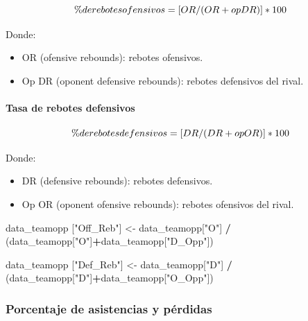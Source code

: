 \documentclass[
]{article}
\newenvironment{Shaded}{\begin{snugshade}}{\end{snugshade}}
\newcommand{\NormalTok}[1]{#1}
\newcommand{\OperatorTok}[1]{\textcolor[rgb]{0.81,0.36,0.00}{\textbf{#1}}}
\newcommand{\StringTok}[1]{\textcolor[rgb]{0.31,0.60,0.02}{#1}}
\providecommand{\tightlist}{%
  \setlength{\itemsep}{0pt}\setlength{\parskip}{0pt}}
\begin{document}
\[
  \makebox[\linewidth]{$\% de rebotes ofensivos = [OR/(OR+op DR)]*100$}
\]

Donde:

\begin{itemize}
\tightlist
\item
  OR (ofensive rebounds): rebotes ofensivos.
\item
  Op DR (oponent defensive rebounds): rebotes defensivos del rival.
\end{itemize}

\hypertarget{tasa-de-rebotes-defensivos}{%
\paragraph{Tasa de rebotes
defensivos}\label{tasa-de-rebotes-defensivos}}

\[
  \makebox[\linewidth]{$\% de rebotes defensivos = [DR/(DR+op OR)]*100$}
\]

Donde:

\begin{itemize}
\tightlist
\item
  DR (defensive rebounds): rebotes defensivos.
\item
  Op OR (oponent ofensive rebounds): rebotes ofensivos del rival.
\end{itemize}

\begin{Shaded}
\begin{Highlighting}[]
\NormalTok{data_teamopp [}\StringTok{"Off_Reb"}\NormalTok{] <-}\StringTok{ }\NormalTok{data_teamopp[}\StringTok{"O"}\NormalTok{] }\OperatorTok{/}\StringTok{  }\NormalTok{(data_teamopp[}\StringTok{"O"}\NormalTok{]}\OperatorTok{+}\NormalTok{data_teamopp[}\StringTok{"D_Opp"}\NormalTok{])}

\NormalTok{data_teamopp [}\StringTok{"Def_Reb"}\NormalTok{] <-}\StringTok{ }\NormalTok{data_teamopp[}\StringTok{"D"}\NormalTok{] }\OperatorTok{/}\StringTok{  }\NormalTok{(data_teamopp[}\StringTok{"D"}\NormalTok{]}\OperatorTok{+}\NormalTok{data_teamopp[}\StringTok{"O_Opp"}\NormalTok{])}
\end{Highlighting}
\end{Shaded}

\hypertarget{porcentaje-de-asistencias-y-puxe9rdidas}{%
\subsubsection{Porcentaje de asistencias y
pérdidas}\label{porcentaje-de-asistencias-y-puxe9rdidas}}
\end{document}
